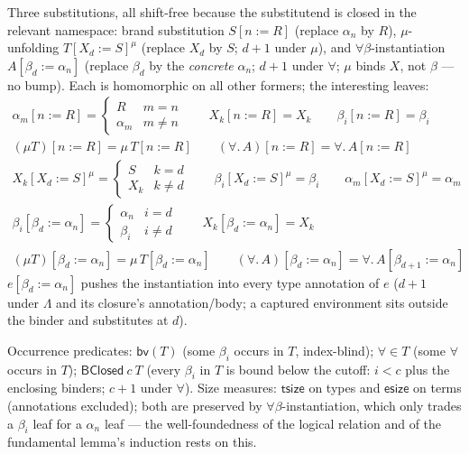 \documentclass[10pt]{article}
\newcommand{\bra}[1]{\alpha_{#1}}
\newcommand{\subs}[3]{#1[#2{:=}#3]}
\newcommand{\bv}[1]{\beta_{#1}}
\newcommand{\allb}[1]{\forall.\,#1}
\newcommand{\hbv}[1]{\mathsf{bv}(#1)}
\newcommand{\hallb}[1]{\forall\!\in\!#1}
\newcommand{\bcl}[2]{\mathsf{BClosed}\ #1\ #2}
\begin{document}
\smallskip
Three substitutions, all shift-free because the substitutend is closed in the relevant
namespace: brand substitution $\subs{S}{n}{R}$ (replace $\bra{n}$ by $R$),
$\mu$-unfolding $\subs{T}{X_d}{S}^{\mu}$ (replace $X_d$ by $S$; $d{+}1$ under $\mu$),
and $\forall\beta$-instantiation $\subs{A}{\bv{d}}{\bra{n}}$ (replace $\bv{d}$ by the
\emph{concrete} $\bra{n}$; $d{+}1$ under $\forall$; $\mu$ binds $X$, not $\beta$ — no
bump).  Each is homomorphic on all other formers; the interesting leaves:
\[
\begin{array}{l}
\subs{\bra{m}}{n}{R} = \begin{cases} R & m = n \\ \bra{m} & m \neq n\end{cases} \qquad
\subs{X_k}{n}{R} = X_k \qquad
\subs{\bv{i}}{n}{R} = \bv{i} \\[3pt]
\subs{(\mu T)}{n}{R} = \mu\,\subs{T}{n}{R} \qquad
\subs{(\allb{A})}{n}{R} = \allb{\subs{A}{n}{R}} \\[3pt]
\subs{X_k}{X_d}{S}^{\mu} = \begin{cases} S & k = d \\ X_k & k \neq d\end{cases} \qquad
\subs{\bv{i}}{X_d}{S}^{\mu} = \bv{i} \qquad
\subs{\bra{m}}{X_d}{S}^{\mu} = \bra{m} \\[3pt]
\subs{\bv{i}}{\bv{d}}{\bra{n}} = \begin{cases} \bra{n} & i = d \\ \bv{i} & i \neq d\end{cases} \qquad
\subs{X_k}{\bv{d}}{\bra{n}} = X_k \\[3pt]
\subs{(\mu T)}{\bv{d}}{\bra{n}} = \mu\,\subs{T}{\bv{d}}{\bra{n}} \qquad
\subs{(\allb{A})}{\bv{d}}{\bra{n}} = \allb{\subs{A}{\bv{d{+}1}}{\bra{n}}}
\end{array}
\]
$\subs{e}{\bv{d}}{\bra{n}}$ pushes the instantiation into every type annotation of $e$
($d{+}1$ under $\Lambda$ and its closure's annotation/body; a captured environment sits
outside the binder and substitutes at $d$).

\smallskip
Occurrence predicates: $\hbv{T}$ (some $\bv{i}$ occurs in $T$, index-blind);
$\hallb{T}$ (some $\forall$ occurs in $T$); $\bcl{c}{T}$ (every $\bv{i}$ in $T$ is
bound below the cutoff: $i < c$ plus the enclosing binders; $c{+}1$ under $\forall$).
Size measures: $\mathsf{tsize}$ on types and $\mathsf{esize}$ on terms (annotations
excluded); both are preserved by $\forall\beta$-instantiation, which only trades a
$\bv{i}$ leaf for a $\bra{n}$ leaf — the well-foundedness of the logical relation and
of the fundamental lemma's induction rests on this.
\end{document}
